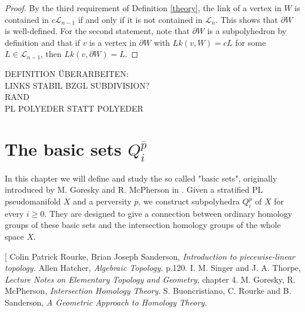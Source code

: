 \documentclass[11pt]{book}
\begin{document}
\begin{proof}
By the third requirement of Definition \ref{theory}, the link of a vertex in $W$ is contained in $c \mathcal{L}_{n-1}$ if and only if it is not contained in $\mathcal{L}_n$. This shows that $\partial W$ is well-defined. For the second statement, note that $\partial W$ is a subpolyhedron by definition and that if $v$ is a vertex in $\partial W$ with $Lk(v,W)=cL$ for some $L \in \mathcal{L}_{n-1}$, then $Lk(v,\partial W) = L$.
\end{proof}

DEFINITION ÜBERARBEITEN: \\
LINKS STABIL BZGL SUBDIVISION? \\
RAND \\
PL POLYEDER STATT POLYEDER


\chapter{The basic sets $Q_i^{\overline{p}}$}
In this chapter we will define and study the so called "basic sets", originally introduced by M. Goresky and R. McPherson in \cite{GM}. Given a stratified PL pseudomanifold $X$ and a perversity $\overline{p}$, we construct subpolyhedra $Q_i^{\overline{p}}$ of $X$ for every $i \geq 0$. They are designed to give a connection between ordinary homology groups of these basic sets and the intersection homology groups of the whole space $X$.



\begin{thebibliography}[
Colin Patrick Rourke, Brian Joseph Sanderson, \textit{Introduction to piecewise-linear topology.}
Allen Hatcher, \textit{Algebraic Topology.} p.120.
I. M. Singer and J. A. Thorpe, \textit{Lecture Notes on Elementary Topology and Geometry}, chapter 4.
M. Goresky, R. McPherson, \textit{Intersection Homology Theory}.
S. Buoncristiano, C. Rourke and B. Sanderson, \textit{A Geometric Approach to Homology Theory}.
\end{thebibliography}
\end{document}
